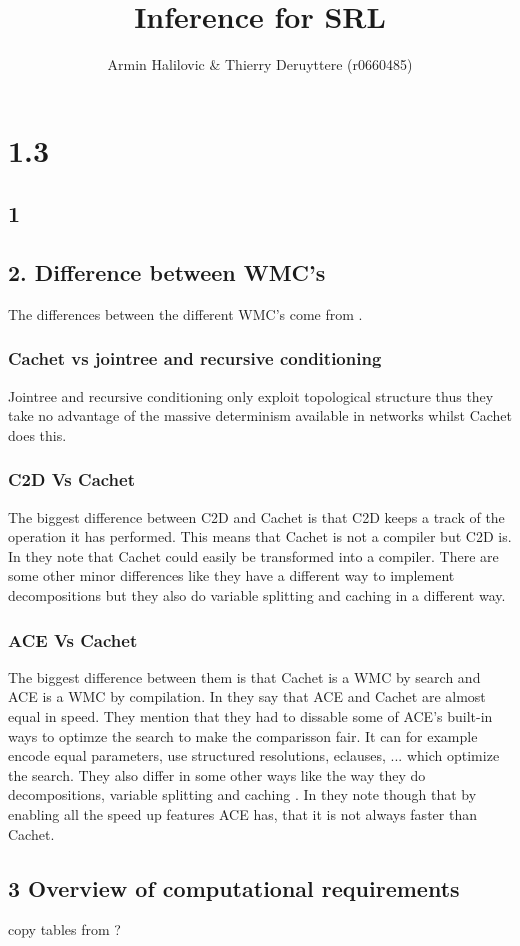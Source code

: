 \documentclass[a4paper,10pt]{article}
\title{Inference for SRL}
\author{Armin Halilovic \& Thierry Deruyttere (r0660485)}
\begin{document}
\maketitle

\section{1.3}
\subsection{1}
\subsection{2. Difference between WMC's}
The differences between the different WMC's come from \cite{CHAVIRA2008772}.
\subsubsection{Cachet vs jointree and recursive conditioning}
Jointree and recursive conditioning only exploit topological structure thus they take no advantage of the massive determinism available in networks whilst Cachet does this.

\subsubsection{C2D Vs Cachet}

The biggest difference between C2D and Cachet is that C2D keeps a track of the operation it has performed. This means that Cachet is not a compiler but C2D is. In \cite{CHAVIRA2008772} they note that Cachet could easily be transformed into a compiler. There are some other minor differences like they have a different way to implement decompositions but they also do variable splitting and caching in a different way.

\subsubsection{ACE Vs Cachet}
The biggest difference between them is that Cachet is a WMC by search and ACE is a WMC by compilation. In \cite{CHAVIRA2008772} they say that ACE and Cachet are almost equal in speed. They mention that they had to dissable some of ACE's built-in ways to optimze the search to make the comparisson fair. It can for example encode equal parameters, use structured resolutions, eclauses, ... \cite{CHAVIRA2008772} which optimize the search.
They also differ in some other ways like the way they do decompositions, variable splitting and caching \cite{CHAVIRA2008772}.
In \cite{CHAVIRA2008772} they note though that by enabling all the speed up features ACE has, that it is not always faster than Cachet. 

\subsection{3 Overview of computational requirements}
copy tables from \cite{CHAVIRA2008772}?



\end{document}
